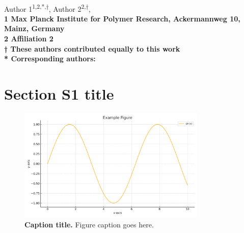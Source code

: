 \documentclass[10pt,letterpaper]{article}
\begin{document}
\vspace*{0.35in}

\begin{flushleft}
{\Large
\textbf{}
}
\newline
\\
Author 1\textsuperscript{1,2,*,†},
Author 2\textsuperscript{2,†},
\\
\bigskip
\bf{1} Max Planck Institute for Polymer Research, Ackermannweg 10, Mainz, Germany
\\
\bf{2} Affiliation 2
\\
\bigskip
† These authors contributed equally to this work
\\
* Corresponding authors: 

\end{flushleft}

\justifying

\section*{Section S1 title}\label{sectionS1}

\captionsetup{labelformat = suppl}
\begin{figure}[ht!]
    \centering
    \includegraphics[width=0.8\textwidth]{example-figure.png}
    \caption{\textbf{Caption title.} Figure caption goes here.}
    \label{fig:SI_example}
\end{figure}



\end{document}
